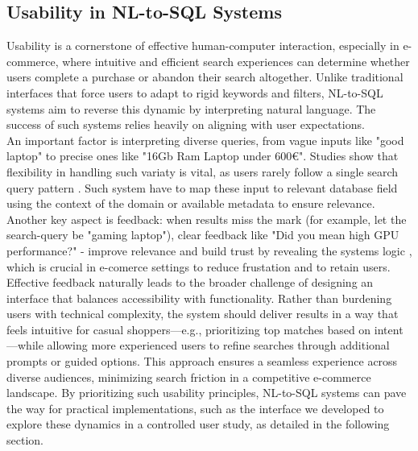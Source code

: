 \documentclass[../../submission.tex]{subfiles}
\begin{document}
\subsection{Usability in NL-to-SQL Systems}
Usability is a cornerstone of effective human-computer interaction, especially 
in e-commerce, where intuitive and efficient search experiences can determine 
whether users complete a purchase or abandon their search altogether. 
Unlike traditional 
interfaces that force users to adapt to rigid keywords and filters, NL-to-SQL systems aim 
to reverse this dynamic by interpreting natural language. The success of such systems relies heavily on aligning with user expectations.\\
An important factor is interpreting diverse queries, from vague inputs like "good laptop" to precise ones 
like "16Gb Ram Laptop under 600€". Studies show that flexibility in handling such variaty is vital, 
as users rarely follow a single search query pattern \cite{manchandaIntentTermSelection2019}. Such system 
have to map these input to relevant database field using the context of the domain or available metadata
to ensure relevance. Another key aspect is feedback: when results miss the mark (for example, let the search-query 
be "gaming laptop"), clear feedback like "Did you mean high GPU performance?" - improve relevance 
and build trust by revealing the systems logic \cite{popescuEtalTowardsTheoryOfNaturalLanguage}, which is 
crucial in e-comerce settings to reduce frustation and to retain users.\\
Effective feedback naturally leads to the broader challenge of designing an interface that balances accessibility 
with functionality. Rather than burdening users with technical complexity, the system should deliver results in 
a way that feels intuitive for casual shoppers—e.g., prioritizing top matches based on intent—while allowing more 
experienced users to refine searches through additional prompts or guided options. This approach ensures a seamless 
experience across diverse audiences, minimizing search friction in a competitive e-commerce landscape. 
By prioritizing such usability principles, NL-to-SQL systems can pave the way for practical implementations, such 
as the interface we developed to explore these dynamics in a controlled user study, as detailed in the following section.
\end{document}
